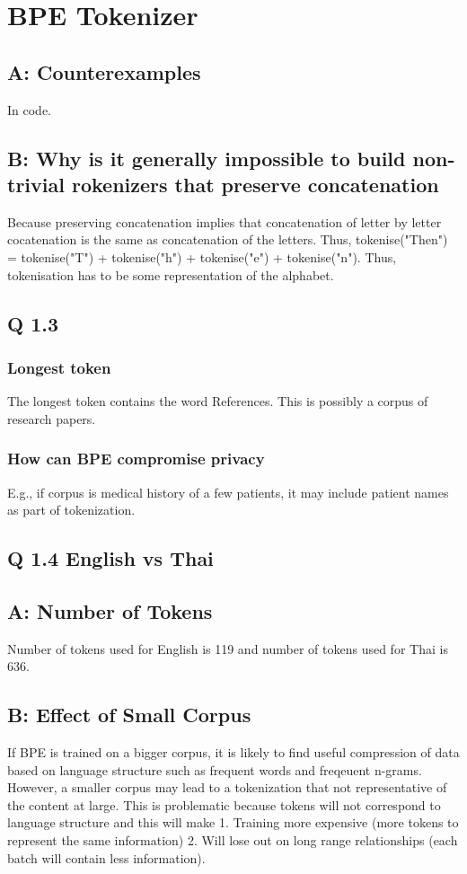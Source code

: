 \documentclass[11pt]{article}
\author{Anshul}
\date{\today}
\title{}
\begin{document}
\tableofcontents

\section{BPE Tokenizer}
\label{sec:orgf18f7fa}
\subsection{A: Counterexamples}
\label{sec:org35199f9}
In code.
\subsection{B: Why is it generally impossible to build non-trivial rokenizers that preserve concatenation}
\label{sec:org5ccc9dd}
Because preserving concatenation implies that concatenation of letter by letter cocatenation is the same as concatenation of the letters. Thus, tokenise("Then") = tokenise("T") + tokenise("h") + tokenise("e") + tokenise("n"). Thus, tokenisation has to be some representation of the alphabet.
\subsection{Q 1.3}
\label{sec:org8ee3fe7}
\subsubsection{Longest token}
\label{sec:orgb6b869a}
The longest token contains the word References. This is possibly a corpus of research papers.
\subsubsection{How can BPE compromise privacy}
\label{sec:org43e48c6}
E.g., if corpus is medical history of a few patients, it may include patient names as part of tokenization.
\subsection{Q 1.4 English vs Thai}
\label{sec:org5583dfa}
\subsection{A: Number of Tokens}
\label{sec:org713fef9}
Number of tokens used for English is 119 and number of tokens used for Thai is 636.
\subsection{B: Effect of Small Corpus}
\label{sec:org34c1043}
If BPE is trained on a bigger corpus, it is likely to find useful compression of data based on language structure such as frequent words and freqeuent n-grams. However, a smaller corpus may lead to a tokenization that not representative of the content at large.  This is problematic because tokens will not correspond to language structure and this will make 1. Training more expensive (more tokens to represent the same information) 2. Will lose out on long range relationships (each batch will contain less information).
\end{document}
